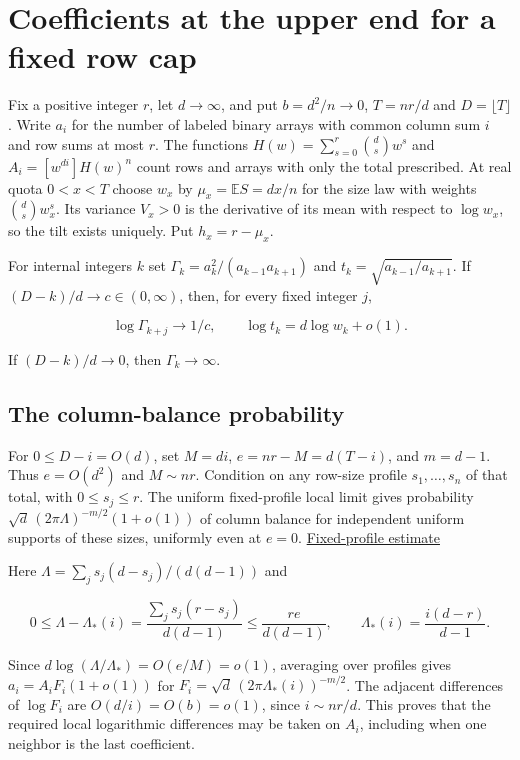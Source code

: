 \section{Coefficients at the upper end for a fixed row cap}\label{sec:upper}

Fix a positive integer $r$, let $d\to\infty$, and put $b=d^2/n\to0$, $T=nr/d$ and $D=\lfloor T\rfloor$. Write $a_i$ for the number of labeled binary arrays with common column sum $i$ and row sums at most $r$. The functions $H(w)=\sum_{s=0}^r\binom ds w^s$ and $A_i=[w^{di}]H(w)^n$ count rows and arrays with only the total prescribed. At real quota $0<x<T$ choose $w_x$ by $\mu_x=\mathbb E S=dx/n$ for the size law with weights $\binom ds w_x^s$. Its variance $V_x>0$ is the derivative of its mean with respect to $\log w_x$, so the tilt exists uniquely. Put $h_x=r-\mu_x$.

For internal integers $k$ set $\Gamma_k=a_k^2/(a_{k-1}a_{k+1})$ and $t_k=\sqrt{a_{k-1}/a_{k+1}}$. If $(D-k)/d\to c\in(0,\infty)$, then, for every fixed integer $j$,

\begin{equation*}
\log\Gamma_{k+j}\to1/c,\qquad \log t_k=d\log w_k+o(1).
\end{equation*}

If $(D-k)/d\to0$, then $\Gamma_k\to\infty$.

\subsection{The column-balance probability}

For $0\le D-i=O(d)$, set $M=di$, $e=nr-M=d(T-i)$, and $m=d-1$. Thus $e=O(d^2)$ and $M\sim nr$. Condition on any row-size profile $s_1,\ldots,s_n$ of that total, with $0\le s_j\le r$. The uniform fixed-profile local limit gives probability $\sqrt d\,(2\pi\Lambda)^{-m/2}(1+o(1))$ of column balance for independent uniform supports of these sizes, uniformly even at $e=0$. \hyperref[sec:profiles]{Fixed-profile estimate}

Here $\Lambda=\sum_j s_j(d-s_j)/(d(d-1))$ and

\begin{equation*}
0\le\Lambda-\Lambda_*(i)=
\frac{\sum_j s_j(r-s_j)}{d(d-1)}\le\frac{re}{d(d-1)},
\qquad \Lambda_*(i)=\frac{i(d-r)}{d-1}.
\end{equation*}

Since $d\log(\Lambda/\Lambda_*)=O(e/M)=o(1)$, averaging over profiles gives $a_i=A_i F_i(1+o(1))$ for $F_i=\sqrt d\,(2\pi\Lambda_*(i))^{-m/2}$. The adjacent differences of $\log F_i$ are $O(d/i)=O(b)=o(1)$, since $i\sim nr/d$. This proves that the required local logarithmic differences may be taken on $A_i$, including when one neighbor is the last coefficient.

